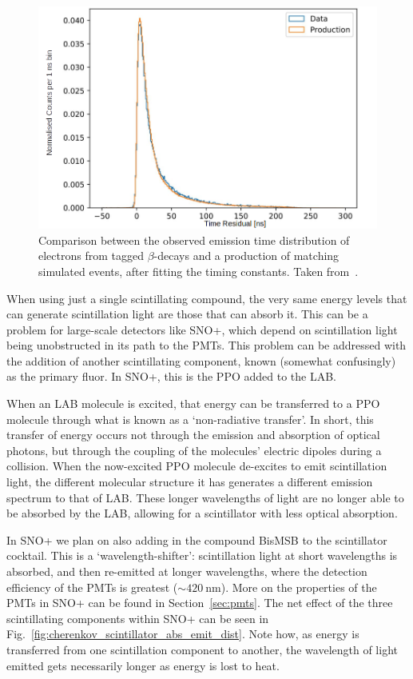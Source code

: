 \begin{figure}
    \centering
    \includegraphics[width=0.8\linewidth]{2_Detector/Figs/scintillator_timing_data_mc.png}
    \caption[]{Comparison between the observed emission time distribution of electrons from tagged  $\beta$-decays and a production of matching simulated events, after fitting the timing constants. Taken from~\cite{hunt-stokesEmissionTimingTuning2022}.%
    }
    \label{fig:typical_tres_dist_physics}
\end{figure}

When using just a single scintillating compound, the very same energy levels that can generate scintillation light are those that can absorb it. This can be a problem for large-scale detectors like SNO+, which depend on scintillation light being unobstructed in its path to the PMTs. This problem can be addressed with the addition of another scintillating component, known (somewhat confusingly) as the primary fluor. In SNO+, this is the PPO added to the LAB.

When an LAB molecule is excited, that energy can be transferred to a PPO molecule through what is known as a `non-radiative transfer'. In short, this transfer of energy occurs not through the emission and absorption of optical photons, but through the coupling of the molecules' electric dipoles during a collision. When the now-excited PPO molecule de-excites to emit scintillation light, the different molecular structure it has generates a different emission spectrum to that of LAB. These longer wavelengths of light are no longer able to be absorbed by the LAB, allowing for a scintillator with less optical absorption.

In SNO+ we plan on also adding in the compound BisMSB to the scintillator cocktail. This is a `wavelength-shifter': scintillation light at short wavelengths is absorbed, and then re-emitted at longer wavelengths, where the detection efficiency of the PMTs is greatest ($\sim\SI{420}{\nm}$). More on the properties of the PMTs in SNO+ can be found in Section~\ref{sec:pmts}. The net effect of the three scintillating components within SNO+ can be seen in Fig.~\ref{fig:cherenkov_scintillator_abs_emit_dist}. Note how, as energy is transferred from one scintillation component to another, the wavelength of light emitted gets necessarily longer as energy is lost to heat.



